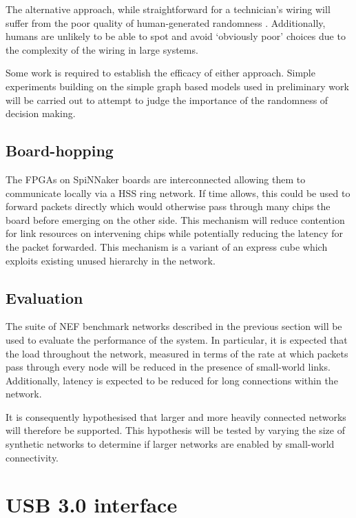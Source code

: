 			The alternative approach, while straightforward for a technician's wiring
			will suffer from the poor quality of human-generated randomness
			\cite{figurska08}. Additionally, humans are unlikely to be able to spot
			and avoid `obviously poor' choices due to the complexity of the wiring in
			large systems.
			
			Some work is required to establish the efficacy of either approach. Simple
			experiments building on the simple graph based models used in preliminary
			work will be carried out to attempt to judge the importance of the
			randomness of decision making.
		
		\subsection{Board-hopping}
			
			
			The FPGAs on SpiNNaker boards are interconnected allowing them to
			communicate locally via a HSS ring network. If time allows, this could be
			used to forward packets directly which would otherwise pass through many
			chips the board before emerging on the other side. This mechanism will
			reduce contention for link resources on intervening chips while
			potentially reducing the latency for the packet forwarded. This mechanism
			is a variant of an express cube \cite{dally91} which exploits existing
			unused hierarchy in the network.
		
		\subsection{Evaluation}
			
			The suite of NEF benchmark networks described in the previous section will
			be used to evaluate the performance of the system. In particular, it is
			expected that the load throughout the network, measured in terms of the
			rate at which packets pass through every node will be reduced in the
			presence of small-world links. Additionally, latency is expected to be
			reduced for long connections within the network.
			
			It is consequently hypothesised that larger and more heavily connected
			networks will therefore be supported. This hypothesis will be tested by
			varying the size of synthetic networks to determine if larger networks are
			enabled by small-world connectivity.
	
	
	\section{USB 3.0 interface}
		
